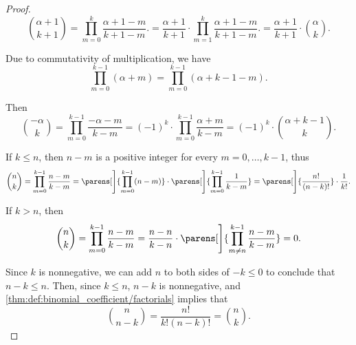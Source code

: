 \begin{proof}
  \begin{equation*}
    \binom {\alpha + 1} {k + 1}
    =
    \prod_{m=0}^k \frac {\alpha + 1 - m} {k + 1 - m}.
    =
    \frac {\alpha + 1} {k + 1} \cdot \prod_{m=1}^k \frac {\alpha + 1 - m} {k + 1 - m}.
    =
    \frac {\alpha + 1} {k + 1} \cdot \binom \alpha k.
  \end{equation*}

   Due to commutativity of multiplication, we have
  \begin{equation*}
    \prod_{m=0}^{k - 1} (\alpha + m)
    =
    \prod_{m=0}^{k - 1} (\alpha + k - 1 - m).
  \end{equation*}

  Then
  \begin{equation*}
    \binom {-\alpha} k
    =
    \prod_{m=0}^{k - 1} \frac {-\alpha - m} {k - m}
    =
    (-1)^k \cdot \prod_{m=0}^{k - 1} \frac {\alpha + m} {k - m}
    =
    (-1)^k \cdot \binom {\alpha + k - 1} k.
  \end{equation*}

   If \( k \leq n \), then \( n - m \) is a positive integer for every \( m = 0, \ldots, k - 1 \), thus
  \begin{equation*}
    \binom n k
    =
    \prod_{m=0}^{k - 1} \frac {n - m} {k - m}
    =
    \parens[\Bigg]{ \prod_{m=0}^{k - 1} (n - m) } \cdot \parens[\Bigg]{ \prod_{m=0}^{k - 1} \frac 1 {k - m} }
    =
    \parens[\Bigg]{ \frac {n!} {(n - k)!} } \cdot \frac 1 {k!}.
  \end{equation*}

  If \( k > n \), then
  \begin{equation*}
    \binom n k
    =
    \prod_{m=0}^{k - 1} \frac {n - m} {k - m}
    =
    \frac {n - n} {k - n} \cdot \parens[\Bigg]{ \prod_{m \neq n}^{k - 1} \frac {n - m} {k - m} }
    =
    0.
  \end{equation*}

   Since \( k \) is nonnegative, we can add \( n \) to both sides of \( -k \leq 0 \) to conclude that \( n - k \leq n \). Then, since \( k \leq n \), \( n - k \) is nonnegative, and \cref{thm:def:binomial_coefficient/factorials} implies that
  \begin{equation*}
    \binom n {n - k} = \frac {n!} {k!(n - k)!} = \binom n k.
  \end{equation*}
\end{proof}

